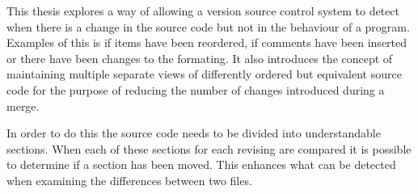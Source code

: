 This thesis explores a way of allowing a version source control system to detect when there is a change in the source code but not in the behaviour of a program.  Examples of this is if items have been reordered, if comments have been inserted or there have been changes to the formating.  It also introduces the concept of maintaining multiple separate views of differently ordered but equivalent source code for the purpose of reducing the number of changes introduced during a merge. 

In order to do this the source code needs to be divided into understandable sections. When each of these sections for each revising are compared it is possible to determine if a section has been moved.  This enhances what can be detected when examining the differences between two files.
